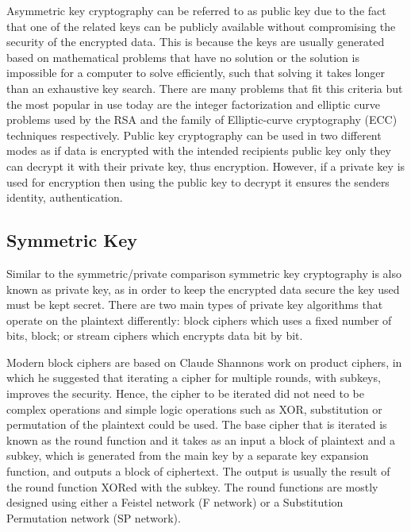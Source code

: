 \documentclass[12pt,twoside,a4paper]{report}
\begin{document}
	Asymmetric key cryptography can be referred to as public key due to the fact that one of the related keys can be publicly available without compromising the security of the encrypted data. This is because the keys are usually generated based on mathematical problems that have no solution or the solution is impossible for a computer to solve efficiently, such that solving it takes longer than an exhaustive key search\cite{BruceSchneier2000}. There are many problems that fit this criteria but the most popular in use today are the integer factorization and elliptic curve problems used by the RSA\cite{Mckaya} and the family of Elliptic-curve cryptography (ECC) techniques\cite{Bos} respectively. Public key cryptography can be used in two different modes as if data is encrypted with the intended recipients public key only they can decrypt it with their private key, thus encryption. However, if a private key is used for encryption then using the public key to decrypt it ensures the senders identity, authentication\cite{AlfredJ.Menezes1996}.
    
	\subsection{Symmetric Key}
    
	Similar to the symmetric/private comparison symmetric key cryptography is also known as private key, as in order to keep the encrypted data secure the key used must be kept secret. There are two main types of private key algorithms that operate on the plaintext differently: block ciphers which uses a fixed number of bits, block; or stream ciphers which encrypts data bit by bit\cite{AlfredJ.Menezes1996}.
    
	Modern block ciphers are based on Claude Shannons work on product ciphers\cite{Shannon1949}, in which he suggested that iterating a cipher for multiple rounds, with subkeys, improves the security. Hence, the cipher to be iterated did not need to be complex operations and simple logic operations such as XOR, substitution or permutation of the plaintext could be used. The base cipher that is iterated is known as the round function and it takes as an input a block of plaintext and a subkey, which is generated from the main key by a separate key expansion function, and outputs a block of ciphertext. The output is usually the result of the round function XORed with the subkey. The round functions are mostly designed using either a Feistel network\cite{Feistel1973} (F network) or a Substitution Permutation network (SP network)\cite{AlfredJ.Menezes1996}.
    
\end{document}
